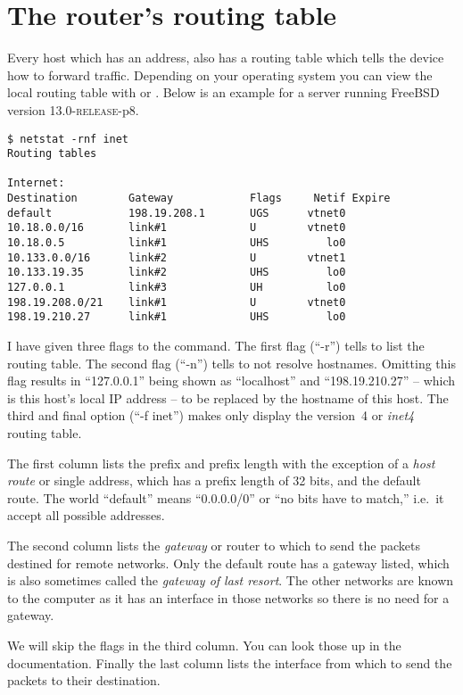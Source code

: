 \section{The router's routing table}

Every host which has an  address, also has a routing table which tells the device how to forward traffic.
Depending on your operating system you can view the local routing table with  or .
Below is an example for a server running FreeBSD version 13.0-\textsc{release}-p8.
\begin{verbatim}
$ netstat -rnf inet
Routing tables

Internet:
Destination        Gateway            Flags     Netif Expire
default            198.19.208.1       UGS      vtnet0
10.18.0.0/16       link#1             U        vtnet0
10.18.0.5          link#1             UHS         lo0
10.133.0.0/16      link#2             U        vtnet1
10.133.19.35       link#2             UHS         lo0
127.0.0.1          link#3             UH          lo0
198.19.208.0/21    link#1             U        vtnet0
198.19.210.27      link#1             UHS         lo0
\end{verbatim}
I have given three flags to the command.
The first flag (``-r'') tells  to list the routing table.
The second flag (``-n'') tells  to not resolve hostnames.
Omitting this flag results in ``127.0.0.1'' being shown as ``localhost'' and ``198.19.210.27'' -- which is this host's local IP address -- to be replaced by the hostname of this host.
The third and final option (``-f inet'') makes  only display the  version~4 or \emph{inet4} routing table.

The first column lists the prefix and prefix length with the exception of a \emph{host route} or single  address, which has a prefix length of 32 bits, and the default route.
The world ``default'' means ``0.0.0.0/0'' or ``no bits have to match,'' i.e.~it accept all possible  addresses.

The second column lists the \emph{gateway} or router to which to send the packets destined for remote networks.
Only the default route has a gateway listed, which is also sometimes called the \emph{gateway of last resort}.
The other networks are known to the computer as it has an interface in those networks so there is no need for a gateway.

We will skip the flags in the third column.
You can look those up in the documentation.
Finally the last column lists the interface from which to send the packets to their destination.

